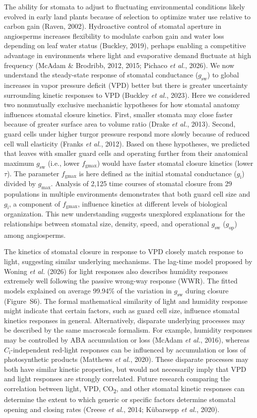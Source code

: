 \documentclass[
  letterpaper,
  DIV=11,
  numbers=noendperiod]{scrartcl}
\newcommand{\fgmax}{$f_\mathrm{gmax}$}
\newcommand{\gi}{$g_\mathrm{i}$}
\newcommand{\gmax}{$g_\mathrm{max}$}
\newcommand{\gop}{$g_\mathrm{op}$}
\newcommand{\gsw}{$g_\mathrm{sw}$}
\begin{document}
The ability for stomata to adjust to fluctuating environmental
conditions likely evolved in early land plants because of selection to
optimize water use relative to carbon gain (Raven, 2002). Hydroactive
control of stomatal aperture in angiosperms increases flexibility to
modulate carbon gain and water loss depending on leaf water status
(Buckley, 2019), perhaps enabling a competitive advantage in
environments where light and evaporative demand fluctuate at high
frequency (McAdam \& Brodribb, 2012, 2015; Pichaco \emph{et al.}, 2026).
We now understand the steady-state response of stomatal conductance
(\gsw) to global increases in vapor pressure deficit (VPD) better but
there is greater uncertainty surrounding kinetic responses to VPD
(Buckley \emph{et al.}, 2023). Here we considered two nonmutually
exclusive mechanistic hypotheses for how stomatal anatomy influences
stomatal closure kinetics. First, smaller stomata may close faster
because of greater surface area to volume ratio (Drake \emph{et al.},
2013). Second, guard cells under higher turgor pressure respond more
slowly because of reduced cell wall elasticity (Franks \emph{et al.},
2012). Based on these hypotheses, we predicted that leaves with smaller
guard cells and operating further from their anatomical maximum \gsw{}
(i.e., lower \fgmax) would have faster stomatal closure kinetics (lower
\(\tau\)). The parameter \fgmax{} is here defined as the initial
stomatal conductance (\gi) divided by \gmax. Analysis of 2,125 time
courses of stomatal closure from 29 populations in multiple environments
demonstrates that both guard cell size and \gi{}, a component of \fgmax,
influence kinetics at different levels of biological organization. This
new understanding suggests unexplored explanations for the relationships
between stomatal size, density, speed, and operational \gsw{} (\gop)
among angiosperms.

The kinetics of stomatal closure in response to VPD closely match
response to light, suggesting similar underlying mechanisms. The
lag-time model proposed by Woning \emph{et al.} (2026) for light
responses also describes humidity responses extremely well following the
passive wrong-way response (WWR). The fitted models explained on average
99.94\% of the variation in \gsw{} during closure
(Figure~S6). The formal mathematical similarity of
light and humidity response might indicate that certain factors, such as
guard cell size, influence stomatal kinetics responses in general.
Alternatively, disparate underlying processes may be described by the
same macroscale formalism. For example, humidity responses may be
controlled by ABA accumulation or loss (McAdam \emph{et al.}, 2016),
whereas \(C_\mathrm{i}\)-independent red-light responses can be
influenced by accumulation or loss of photosynthetic products (Matthews
\emph{et al.}, 2020). These disparate processes may both have similar
kinetic properties, but would not necessarily imply that VPD and light
responses are strongly correlated. Future research comparing the
correlation between light, VPD, CO\textsubscript{2}, and other stomatal
kinetic responses can determine the extent to which generic or specific
factors determine stomatal opening and closing rates (Creese \emph{et
al.}, 2014; Kübarsepp \emph{et al.}, 2020).
\end{document}
